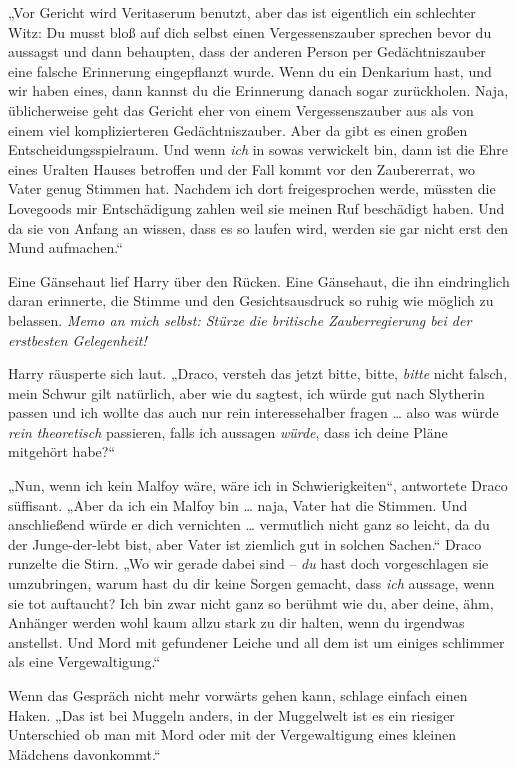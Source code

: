 {„Vor Gericht wird Veritaserum benutzt, aber das ist eigentlich ein schlechter Witz: Du musst bloß auf dich selbst einen Vergessenszauber sprechen bevor du aussagst und dann behaupten, dass der anderen Person per Gedächtniszauber eine falsche Erinnerung eingepflanzt wurde. Wenn du ein Denkarium hast, und wir haben eines, dann kannst du die Erinnerung danach sogar zurückholen. Naja, üblicherweise geht das Gericht eher von einem Vergessenszauber aus als von einem viel komplizierteren Gedächtniszauber. Aber da gibt es einen großen Entscheidungsspielraum. Und wenn \emph{ich} in sowas verwickelt bin, dann ist die Ehre eines Uralten Hauses betroffen und der Fall kommt vor den Zaubererrat, wo Vater genug Stimmen hat. Nachdem ich dort freigesprochen werde, müssten die Lovegoods mir Entschädigung zahlen weil sie meinen Ruf beschädigt haben. Und da sie von Anfang an wissen, dass es so laufen wird, werden sie gar nicht erst den Mund aufmachen.“

Eine Gänsehaut lief Harry über den Rücken. Eine Gänsehaut, die ihn eindringlich daran erinnerte, die Stimme und den Gesichtsausdruck so ruhig wie möglich zu belassen. \emph{Memo an mich selbst: Stürze die britische Zauberregierung bei der erstbesten Gelegenheit!}

Harry räusperte sich laut. „Draco, versteh das jetzt bitte, bitte, \emph{bitte} nicht falsch, mein Schwur gilt natürlich, aber wie du sagtest, ich würde gut nach Slytherin passen und ich wollte das auch nur rein interessehalber fragen … also was würde \emph{rein theoretisch} passieren, falls ich aussagen \emph{würde}, dass ich deine Pläne mitgehört habe?“

„Nun, wenn ich kein Malfoy wäre, wäre ich in Schwierigkeiten“, antwortete Draco süffisant. „Aber da ich ein Malfoy bin … naja, Vater hat die Stimmen. Und anschließend würde er dich vernichten … vermutlich nicht ganz so leicht, da du der Junge-der-lebt bist, aber Vater ist ziemlich gut in solchen Sachen.“ Draco runzelte die Stirn. „Wo wir gerade dabei sind -- \emph{du} hast doch vorgeschlagen sie umzubringen, warum hast du dir keine Sorgen gemacht, dass \emph{ich} aussage, wenn sie tot auftaucht? Ich bin zwar nicht ganz so berühmt wie du, aber deine, ähm, Anhänger werden wohl kaum allzu stark zu dir halten, wenn du irgendwas anstellst. Und Mord mit gefundener Leiche und all dem ist um einiges schlimmer als eine Vergewaltigung.“

Wenn das Gespräch nicht mehr vorwärts gehen kann, schlage einfach einen Haken. „Das ist bei Muggeln anders, in der Muggelwelt ist es ein riesiger Unterschied ob man mit Mord oder mit der Vergewaltigung eines kleinen Mädchens davonkommt.“

}
